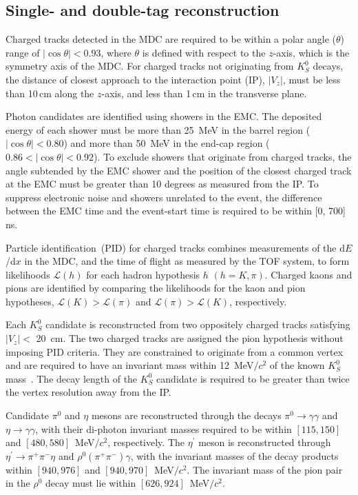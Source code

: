 \documentclass[12pt, a4paper, notitlepage, onecolumn]{article}
\begin{document}
\subsection{Single- and double-tag reconstruction}
\noindent Charged tracks detected in the MDC are required to be within a polar angle ($\theta$) range of $|\!\cos\theta|<0.93$, where $\theta$ is defined with respect to the $z$-axis, which is the symmetry axis of the MDC. For charged tracks not originating from $K_S^0$ decays, the distance of closest approach to the interaction point (IP), $|V_{z}|$, must be less than 10\,cm along the $z$-axis, and less than 1\,cm in the transverse plane.

Photon candidates are identified using showers in the EMC. The deposited energy of each shower must be more than 25~MeV in the barrel region ($|\cos \theta|< 0.80$) and more than 50~MeV in the end-cap region ($0.86 <|\!\cos \theta|< 0.92$). To exclude showers that originate from charged tracks, the angle subtended by the EMC shower and the position of the closest charged track at the EMC must be greater than 10 degrees as measured from the IP. To suppress electronic noise and showers unrelated to the event, the difference between the EMC time and the event-start time is required to be within [0, 700]\,ns.

Particle identification~(PID) for charged tracks combines measurements of the d$E$/d$x$ in the MDC, and the time of flight as measured by the TOF system, to form likelihoods $\mathcal{L}(h)$ for each hadron hypothesis $h$ $(h=K,\pi)$. Charged kaons and pions are identified by comparing the likelihoods for the kaon and pion hypotheses, $\mathcal{L}(K)>\mathcal{L}(\pi)$ and $\mathcal{L}(\pi)>\mathcal{L}(K)$, respectively.

Each $K_{S}^0$ candidate is reconstructed from two oppositely charged tracks satisfying $|V_{z}|<$ 20~cm. The two charged tracks are assigned the pion hypothesis without imposing PID criteria. They are constrained to originate from a common vertex and are required to have an invariant mass within 12~MeV$/c^{2}$ of the known $K^0_{S}$ mass~\cite{pdg}. The decay length of the $K^0_S$ candidate is required to be greater than twice the vertex resolution away from the IP.

Candidate $\pi^0$ and $\eta$ mesons are reconstructed through the decays $\pi^0\to\gamma\gamma$ and $\eta\to\gamma\gamma$, with their di-photon invariant masses required to be within $[115, 150]$ and $[480, 580]$~MeV$/c^2$, respectively. The $\eta^\prime$ meson is reconstructed through  $\eta^\prime\to\pi^+\pi^-\eta$ and $\rho^0(\pi^+\pi^-)\gamma$, with the invariant masses of the decay products within $[940, 976]$ and $[940, 970]$~MeV$/c^2$. The invariant mass of the pion pair in the $\rho^0$ decay must lie within $[626, 924]$~MeV$/c^2$.
\end{document}
